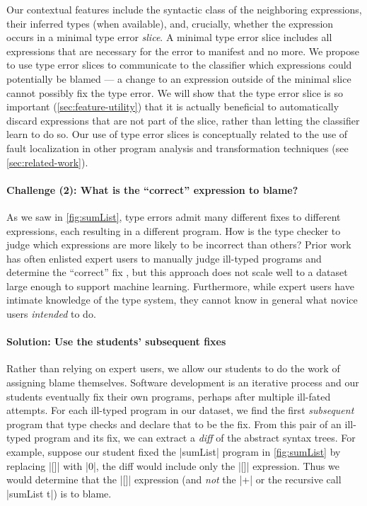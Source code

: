 Our contextual features include the syntactic class of the neighboring
expressions, their inferred types (when available), and, crucially, whether
the expression occurs in a minimal type error \emph{slice}.
%
A minimal type error slice \citep{Haack2003-vc} includes all expressions that
are necessary for the error to manifest and no more.
%
We propose to use type error slices to communicate to the classifier
which expressions could potentially be blamed --- a change to an
expression outside of the minimal slice cannot possibly fix the type
error.
%
We will show that the type error slice is so important
(\autoref{sec:feature-utility}) that it is actually beneficial to
automatically discard expressions that are not part of the slice, rather
than letting the classifier learn to do so.
%
Our use of type error slices is conceptually related to the use of fault
localization in other program analysis and transformation techniques
(see \autoref{sec:related-work}).

\paragraph{\textbf{Challenge (2): What is the ``correct'' expression to blame?}}
As we saw in \autoref{fig:sumList}, type errors admit many different
fixes to different expressions, each resulting in a different program.
%
How is the type checker to judge which expressions are more likely to be
incorrect than others?
%
Prior work has often enlisted expert users to manually judge ill-typed
programs and determine the ``correct'' fix
\citep[\eg][]{Lerner2007-dt,Loncaric2016-uk}, but this approach does not
scale well to a dataset large enough to support machine learning.
%
Furthermore, while expert users have intimate knowledge of the type system,
they cannot know in general what novice users \emph{intended} to do.

\paragraph{\textbf{Solution: Use the students' subsequent fixes}}
%
Rather than relying on expert users, we allow our students to do the
work of assigning blame themselves.
%
Software development is an iterative process and our students 
eventually fix their own programs, perhaps after multiple ill-fated
attempts.
%
For each ill-typed program in our dataset, we find the first
\emph{subsequent} program that type checks and declare that to be the
fix.
%
From this pair of an ill-typed program and its fix, we can extract a
\emph{diff} of the abstract syntax trees.
%
For example, suppose our student fixed the |sumList| program in
\autoref{fig:sumList} by replacing |[]| with |0|, the diff would include
only the |[]| expression.
%
Thus we would determine that the |[]| expression (and \emph{not} the
|+| or the recursive call |sumList t|) is to blame.



